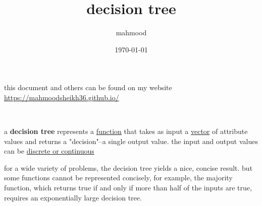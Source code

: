 \documentclass[a4paper,12pt]{article}
\author{mahmood}
\date{\today}
\title{decision tree}
\begin{document}
\maketitle
\begin{note}
this document and others can be found on my website\\
\url{https://mahmoodsheikh36.github.io/}
\end{note}
\cite{aima2010}\\
\begin{definition}
a \textbf{decision tree} represents a \href{discrete_maths2.org}{function} that takes as input a \href{linear_algebra2.org}{vector} of attribute values and returns a "decision"--a single output value. the input and output values can be \href{20221015110034-discrete_continuous_data.org}{discrete or continuous}\\
\begin{characteristic}
for a wide variety of problems, the decision tree yields a nice, concise result. but some functions cannot be represented concisely, for example, the majority function, which returns true if and only if more than half of the inputs are true, requires an exponentially large decision tree.\\
\end{characteristic}
\end{definition}
\end{document}
